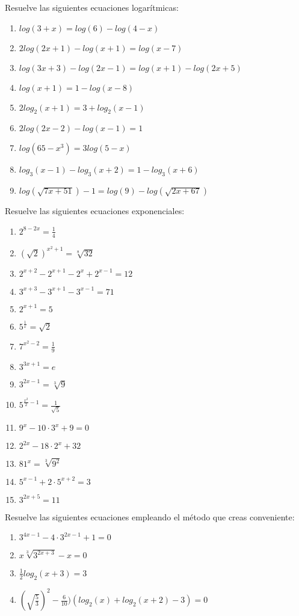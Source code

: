 \Exercicio Resuelve las siguientes ecuaciones logarítmicas:

\begin{enumerate}[topsep=0pt]
	\item $ log(3+x) = log (6) -log(4-x) $
	\item $ 2 log(2x+1) - log(x+1) = log(x-7)$
	\item $ log(3x+3) - log(2x-1) = log(x+1) - log(2x+5)$
	\item $ log(x+1) = 1 - log(x-8)$
	\item $ 2log_2(x+1) = 3 + log_2(x-1)$
	\item $ 2log(2x-2)-log(x-1) = 1$
	\item $ log(65-x^3)= 3log(5-x)$
	\item $ log_3(x-1) - log_3 (x+2) = 1 - log_3(x+6)$
	\item $ log(\sqrt{7x+51}) -1 = log(9) - log(\sqrt{2x+67})$
\end{enumerate}

\Exercicio Resuelve las siguientes ecuaciones exponenciales:

\begin{enumerate}[topsep=0pt]
	\item $ 2^{8-2x} = \frac{1}{4} $
	\item $ (\sqrt{2})^{x^2+1} = \sqrt[8]{32}$
	\item $ 2^{x+2} - 2^{x+1} - 2^x + 2^{x-1} = 12$
	\item $ 3^{x+3} - 3^{x+1} - 3^{x-1} = 71 $
	\item $ 2^{x+1} = 5 $
	\item $ 5^{\frac{1}{x}} = \sqrt{2} $
	\item $ 7^{x^2-2} = \frac{1}{9}$
	\item $ 3^{3x+1} = e$
	\item $ 3^{2x-1} = \sqrt[3]{9}$
	\item $ 5^{\frac{x^2}{2}-1} = \frac{1}{\sqrt{5}}$
	\item $ 9^x - 10 \cdot 3^x + 9 = 0$
	\item $ 2^{2x} - 18 \cdot 2^x + 32$
	\item $ 81^x = \sqrt[3]{9^2}$
	\item $ 5^{x-1} + 2 \cdot 5^{x+2} = 3$
	\item $ 3^{2x+5} = 11$
\end{enumerate}

\Exercicio Resuelve las siguientes ecuaciones empleando el método que creas conveniente:
\begin{enumerate}[topsep=0pt]
	\item $ 3^{4x-1} - 4 \cdot 3^{2x-1} + 1 = 0 $
	\item $ x \sqrt[3]{3^{2x+3}} - x = 0$
	\item $ \frac{1}{2} log_2 (x+3) = 3$
	\item $ ( \sqrt{\frac{5}{3}})^2- \frac{6}{10})(log_2  (x) + log_2 (x+2) - 3) = 0 $
\end{enumerate}

